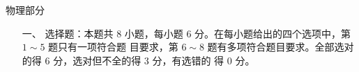 
\begin{center}
\heiti 
{}
物理部分
\end{center}
\vspace{2em}



\begin{enumerate}
\heiti
\renewcommand{\labelenumi}{\arabic{enumi}.}
\item[一、]
选择题：本题共 $ 8 $ 小题，每小题 $ 6 $ 分。在每小题给出的四个选项中，第 $ 1 \sim 5 $ 题只有一项符合题
目要求，第 $ 6 \sim 8 $ 题有多项符合题目要求。全部选对的得 $ 6 $ 分，选对但不全的得 $ 3 $ 分，有选错的
得 $ 0 $ 分。




\end{enumerate}


